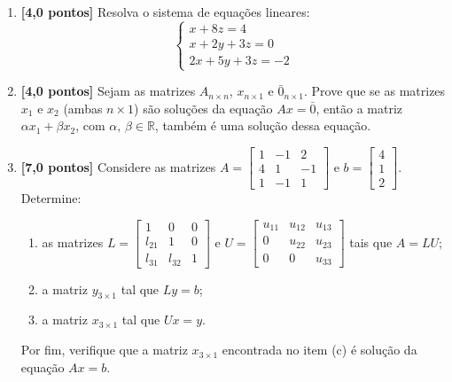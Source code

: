 \documentclass[12pt,a4paper]{article}
\begin{document}
\begin{enumerate}
  \item \textbf{[4,0 pontos]} Resolva o sistema de equações lineares:
    $$\begin{cases}
      x +  8 z  =  4\\
      x  +  2y  +  3z  =  0\\
      2x  +  5y  +  3z  =  -2
    \end{cases}$$
    
  \item \textbf{[4,0 pontos]} Sejam as matrizes $A_{n\times n}$, $x_{n\times 1}$ e $\bar{0}_{n\times 1}$. Prove 
    que se as matrizes $x_1$ e $x_2$ (ambas $n\times 1$) são soluções da equação 
    $Ax = \bar{0}$, então a matriz $\alpha x_1 + \beta x_2$, com $\alpha,\,\beta\in\mathbb{R}$, 
    também é uma solução dessa equação.
    
  \item \textbf{[7,0 pontos]} Considere as matrizes 
    $A = \begin{bmatrix} 1 & -1 & 2 \\ 4 & 1 & -1 \\ 1 & -1 & 1\end{bmatrix}$ e 
    $b = \begin{bmatrix} 4 \\ 1 \\ 2\end{bmatrix}$. Determine:
    
    \begin{enumerate}
      \item as matrizes $L = \begin{bmatrix} 1 & 0 & 0 \\ l_{21} & 1 & 0 \\ l_{31} & l_{32} & 1\end{bmatrix}$ 
        e $U = \begin{bmatrix} u_{11} & u_{12} & u_{13} \\ 0 & u_{22} & u_{23} \\ 0 & 0 & u_{33}\end{bmatrix}$ 
        tais que $A = LU$;
      \item a matriz $y_{3\times 1}$ tal que $Ly = b$;
      \item a matriz $x_{3\times 1}$ tal que $Ux = y$.
    \end{enumerate}
    
    Por fim, verifique que a matriz $x_{3\times 1}$ encontrada no item (c) 
    é solução da equação $Ax = b$.
   
  \end{enumerate}
\end{document}
